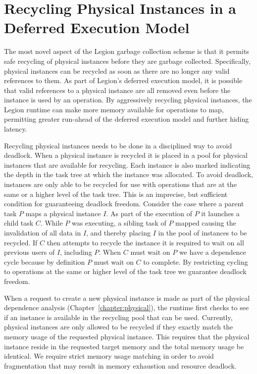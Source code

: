 \section{Recycling Physical Instances in a Deferred Execution Model}
\label{sec:recycling}
The most novel aspect of the Legion garbage
collection scheme is that it permits safe recycling of 
physical instances before they are garbage collected.
Specifically, physical instances can be recycled as soon
as there are no longer any valid references to them.
As part of Legion's deferred execution model, it is 
possible that valid references to a physical instance
are all removed even before the instance is used by
an operation. By aggressively recycling physical instances, 
the Legion runtime can make more memory available
for operations to map, permitting greater run-ahead of
the deferred execution model and further hiding latency.

Recycling physical instances needs to be done in a 
disciplined way to avoid deadlock. When a physical instance
is recycled it is placed in a pool for physical instances
that are available for recycling. Each instance is also
marked indicating the depth in the task tree at which
the instance was allocated. To avoid deadlock, instances
are only able to be recycled for use with operations that
are at the same or a higher level of the task tree. 
This is an imprecise, but sufficient condition for guaranteeing
deadlock freedom. Consider the case where a parent task
$P$ maps a physical instance $I$.  As part of the execution
of $P$ it launches a child task $C$.  While $P$ was executing,
a sibling task of $P$ mapped causing the invalidation of all 
data in $I$, and thereby placing $I$ in the pool of instances to be recycled.
If $C$ then attempts to recycle the instance it is required
to wait on all previous users of $I$, including $P$.  When
$C$ must wait on $P$ we have a dependence cycle because
by definition $P$ must wait on $C$ to complete. By restricting
cycling to operations at the same or higher level of the
task tree we guarantee deadlock freedom. 

When a request to create a new physical instance is made as 
part of the physical dependence analysis 
(Chapter~\ref{chapter:physical}), the runtime
first checks to see if an instance is available in the
recycling pool that can be used. Currently, physical
instances are only allowed to be recycled if they exactly
match the memory usage of the requested physical instance.
This requires that the physical instance reside in the
requested target memory and the total memory usage be
identical. We require strict memory usage matching in 
order to avoid fragmentation that may result in memory
exhaustion and resource deadlock.

